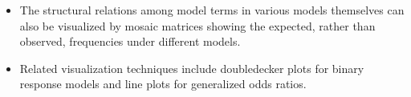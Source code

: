 \begin{itemize}
\item The structural relations among model terms in various \loglin
models themselves can also be visualized by mosaic matrices
showing the expected, rather than observed, frequencies under different
models.

\item Related visualization techniques include doubledecker plots for
  binary response models and line plots for generalized odds ratios.

\end{itemize}

